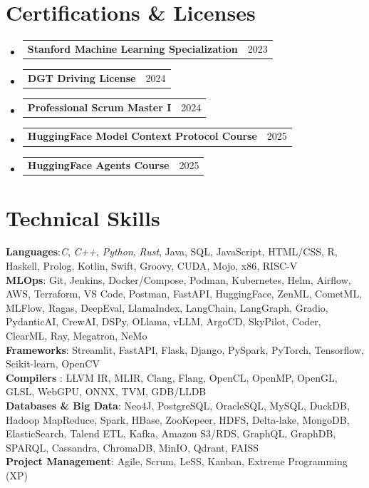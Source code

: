 \documentclass[letterpaper,8pt]{article} %
\makeatletter
\newcommand{\resumeProjectHeading}[2]{
    \item
    \begin{tabular*}{0.97\textwidth}{l@{\extracolsep{\fill}}r}
      \small#1 & #2 \\
    \end{tabular*}\vspace{-7pt}
}
\newcommand{\resumeSubHeadingListStart}{\begin{itemize}[leftmargin=0.15in, label={}]}
\newcommand{\resumeSubHeadingListEnd}{\end{itemize}}
\makeatother
\begin{document}
\section{Certifications \& Licenses}
    \resumeSubHeadingListStart
      \resumeProjectHeading
          {\textbf{Stanford Machine Learning Specialization}}{2023}
      \resumeProjectHeading
          {\textbf{DGT Driving License}}{2024}
      \resumeProjectHeading
          {\textbf{Professional Scrum Master I}}{2024}
      \resumeProjectHeading
          {\textbf{HuggingFace Model Context Protocol Course}}{2025}
      \resumeProjectHeading
          {\textbf{HuggingFace Agents Course}}{2025}


    \resumeSubHeadingListEnd


\section{Technical Skills}
 \begin{itemize}[leftmargin=0.15in, label={}]
    \footnotesize{\item{
     \textbf{Languages}{:\textit{C}, \textit{C++}, \textit{Python}, \textit{Rust}, Java, SQL, JavaScript, HTML/CSS, R, Haskell, Prolog, Kotlin, Swift, Groovy, CUDA, Mojo,  x86, RISC-V} \\
     \textbf{MLOps}{: Git, Jenkins, Docker/Compose, Podman, Kubernetes, Helm,  Airflow, AWS, Terraform, VS Code, Postman, FastAPI, HuggingFace, ZenML, CometML, MLFlow, Ragas, DeepEval, LlamaIndex, LangChain, LangGraph, Gradio, PydanticAI, CrewAI, DSPy, OLlama, vLLM, ArgoCD, SkyPilot, Coder, ClearML, Ray, Megatron, NeMo} \\
     \textbf{Frameworks}{: Streamlit, FastAPI, Flask, Django, PySpark, PyTorch, Tensorflow, Scikit-learn, OpenCV}\\
     \textbf{Compilers} {:  LLVM IR, MLIR, Clang, Flang, OpenCL, OpenMP, OpenGL, GLSL, WebGPU, ONNX, TVM, GDB/LLDB} \\
     \textbf{Databases \& Big Data}{: Neo4J, PostgreSQL, OracleSQL, MySQL, DuckDB, Hadoop MapReduce, Spark, HBase, ZooKepeer, HDFS, Delta-lake, MongoDB, ElasticSearch, Talend ETL, Kafka, Amazon S3/RDS, GraphQL, GraphDB, SPARQL, Cassandra, ChromaDB, MinIO, Qdrant, FAISS} \\
     \textbf{Project Management}{: Agile, Scrum, LeSS, Kanban, Extreme Programming (XP)}
    }}
 \end{itemize}
\end{document}
